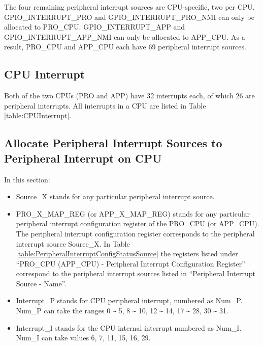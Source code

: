 \documentclass[main\_\_EN.tex]{subfiles}
\begin{document}
The four remaining peripheral interrupt sources are CPU-specific, two per CPU. GPIO\_INTERRUPT\_PRO and GPIO\_INTERRUPT\_PRO\_NMI can only be allocated to PRO\_CPU. GPIO\_INTERRUPT\_APP and GPIO\_INTERRUPT\_APP\_NMI can only be allocated to APP\_CPU.
As a result, PRO\_CPU and APP\_CPU each have 69 peripheral interrupt sources.




\subsection{CPU Interrupt}

Both of the two CPUs (PRO and APP) have 32 interrupts each, of which 26 are peripheral interrupts.
All interrupts in a CPU are listed in Table \ref{table:CPUInterrupt}.




\subsection{Allocate Peripheral Interrupt Sources to Peripheral Interrupt on CPU}

In this section:

\begin{itemize}

\item Source\_X stands for any particular peripheral interrupt source.

\item PRO\_X\_MAP\_REG (or APP\_X\_MAP\_REG) stands for any particular peripheral interrupt configuration register of the PRO\_CPU (or APP\_CPU). The peripheral interrupt configuration register corresponds to the peripheral interrupt source Source\_X. In Table \ref{table:PeripheralInterruptConfigStatusSource} the registers listed under “PRO\_CPU (APP\_CPU) - Peripheral Interrupt Configuration Register” correspond to the peripheral interrupt sources listed in “Peripheral Interrupt Source - Name”.

\item Interrupt\_P stands for CPU peripheral interrupt, numbered as Num\_P. Num\_P can take the ranges 0 \verb+~+ 5, 8 \verb+~+ 10, 12 \verb+~+ 14, 17 \verb+~+ 28, 30 \verb+~+ 31.

\item Interrupt\_I stands for the CPU internal interrupt numbered as Num\_I. Num\_I can take values 6, 7, 11, 15, 16, 29.

\end{itemize}
\end{document}

